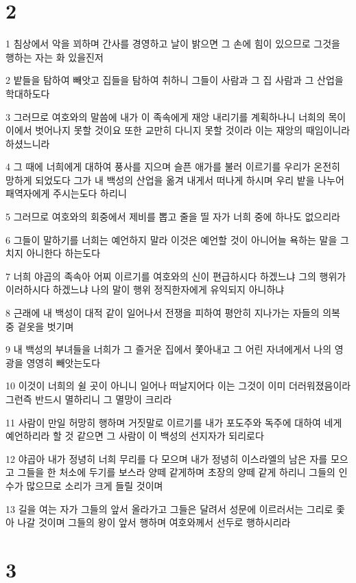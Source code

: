 \chapter{2}

\par 1 침상에서 악을 꾀하며 간사를 경영하고 날이 밝으면 그 손에 힘이 있으므로 그것을 행하는 자는 화 있을진저
\par 2 밭들을 탐하여 빼앗고 집들을 탐하여 취하니 그들이 사람과 그 집 사람과 그 산업을 학대하도다
\par 3 그러므로 여호와의 말씀에 내가 이 족속에게 재앙 내리기를 계획하나니 너희의 목이 이에서 벗어나지 못할 것이요 또한 교만히 다니지 못할 것이라 이는 재앙의 때임이니라 하셨느니라
\par 4 그 때에 너희에게 대하여 풍사를 지으며 슬픈 애가를 불러 이르기를 우리가 온전히 망하게 되었도다 그가 내 백성의 산업을 옮겨 내게서 떠나게 하시며 우리 밭을 나누어 패역자에게 주시는도다 하리니
\par 5 그러므로 여호와의 회중에서 제비를 뽑고 줄을 띨 자가 너희 중에 하나도 없으리라
\par 6 그들이 말하기를 너희는 예언하지 말라 이것은 예언할 것이 아니어늘 욕하는 말을 그치지 아니한다 하는도다
\par 7 너희 야곱의 족속아 어찌 이르기를 여호와의 신이 편급하시다 하겠느냐 그의 행위가 이러하시다 하겠느냐 나의 말이 행위 정직한자에게 유익되지 아니하냐
\par 8 근래에 내 백성이 대적 같이 일어나서 전쟁을 피하여 평안히 지나가는 자들의 의복 중 겉옷을 벗기며
\par 9 내 백성의 부녀들을 너희가 그 즐거운 집에서 쫓아내고 그 어린 자녀에게서 나의 영광을 영영히 빼앗는도다
\par 10 이것이 너희의 쉴 곳이 아니니 일어나 떠날지어다 이는 그것이 이미 더러워졌음이라 그런즉 반드시 멸하리니 그 멸망이 크리라
\par 11 사람이 만일 허망히 행하며 거짓말로 이르기를 내가 포도주와 독주에 대하여 네게 예언하리라 할 것 같으면 그 사람이 이 백성의 선지자가 되리로다
\par 12 야곱아 내가 정녕히 너희 무리를 다 모으며 내가 정녕히 이스라엘의 남은 자를 모으고 그들을 한 처소에 두기를 보스라 양떼 같게하며 초장의 양떼 같게 하리니 그들의 인수가 많으므로 소리가 크게 들릴 것이며
\par 13 길을 여는 자가 그들의 앞서 올라가고 그들은 달려서 성문에 이르러서는 그리로 좇아 나갈 것이며 그들의 왕이 앞서 행하며 여호와께서 선두로 행하시리라

\chapter{3}

